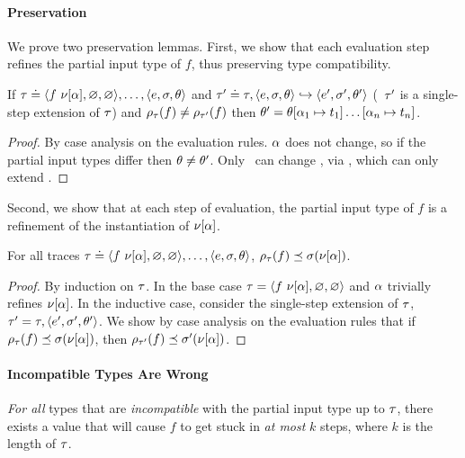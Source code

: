 \paragraph{Preservation}
%
We prove two preservation lemmas. First, we show that each evaluation
step refines the partial input type of $f$, thus preserving type
compatibility.
%
\begin{lem}
\label{lem:vsu-ext}
If  $\tau \doteq \langle f\ \nu[\alpha], \varnothing, \varnothing \rangle,\ldots,\langle e, \sigma, \theta \rangle$
and $\tau' \doteq \tau, \langle e, \sigma, \theta \rangle \hookrightarrow \langle e', \sigma', \theta' \rangle$
  (\ie\ $\tau'$ is a single-step extension of $\tau$)
and $\rho_{\tau}(f) \neq \rho_{\tau'}(f)$
then $\theta' = \theta[\alpha_1 \mapsto t_1] \ldots [\alpha_n \mapsto t_n]$.
\end{lem}
\begin{proof}
  By case analysis on the evaluation rules.
  $\alpha$ does not change, so if the partial input types differ then
  $\theta \neq \theta'$.
  Only \forcesym\ can change \tsu,
  via \unifysym, which can only extend \tsu.
\end{proof}
%
Second, we show that at each step of evaluation, the partial input type of $f$
is a refinement of the instantiation of $\nu[\alpha]$.
%
\begin{lem}
\label{lem:resolve-compat}
For all traces
$\tau \doteq \langle f\ \nu[\alpha], \varnothing, \varnothing \rangle,\ldots,\langle e, \sigma, \theta \rangle$,
${\rho_{\tau}(f)} \preceq {\ensuremath{\sigma(\nu[\alpha])}}$.
\end{lem}
\begin{proof}
  By induction on $\tau$.
  In the base case $\tau = \langle f\ \nu[\alpha], \varnothing, \varnothing \rangle$
  and $\alpha$ trivially refines $\nu[\alpha]$.
  In the inductive case, consider the single-step extension of $\tau$,
  $\tau' = \tau,\langle e', \sigma', \theta' \rangle$.
  We show by case analysis on the evaluation rules that if
  ${\rho_{\tau}(f)} \preceq {\ensuremath{\sigma(\nu[\alpha])}}$, then
  ${\rho_{\tau'}(f)} \preceq {\ensuremath{\sigma'(\nu[\alpha])}}$.
\end{proof}

\paragraph{Incompatible Types Are Wrong}
\emph{For all} types that are \emph{incompatible} with the
partial input type up to $\tau$, there exists a value
that will cause $f$ to get stuck in \emph{at most} $k$ steps,
where $k$ is the length of $\tau$.

